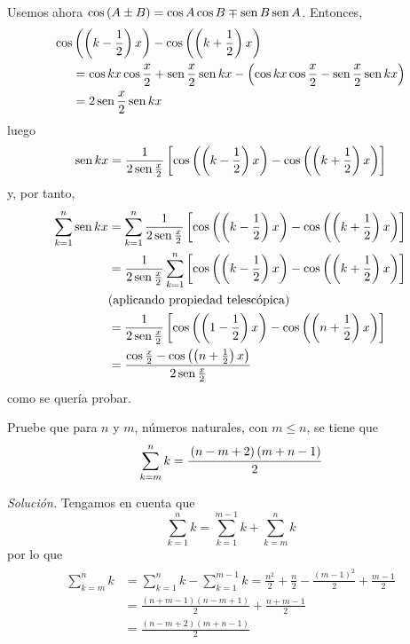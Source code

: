 \begin{parrafonumerado}[label=\alph*)]
\item Usemos ahora $\cos \left( A\pm B\right) =\cos A\cos B\mp \operatorname{sen} B\operatorname{sen} A$. Entonces,
\begin{align*}
\cos &\left( \left( k-\frac{1}{2}\right) x\right) -\cos \left( \left( k+\frac{1}{2}\right) x\right)\\
&=\cos kx\cos \frac{x}{2}+\operatorname{sen} \frac{x}{2}\operatorname{sen}
kx-\left( \cos kx\cos \frac{x}{2}-\operatorname{sen} \frac{x}{2}\operatorname{sen} kx\right)\\
&=2\operatorname{sen} \frac{x}{2}\operatorname{sen} kx
\end{align*}
luego
\[
\sen kx=\frac{1}{2\sen\frac{x}{2}}\left[ \cos \left( \left( k-\frac{1%
  }{2}\right) x\right) -\cos \left( \left( k+\frac{1}{2}\right) x\right) %
\right]
\]
y, por tanto,
\begin{gather*}
\begin{aligned}
  \sum\limits_{k=1}^{n}\sen kx&=\sum\limits_{k=1}^{n}\frac{1}{2\sen\frac{x}{2}}\left[ \cos \left( \left( k-\frac{1}{2}\right) x\right) -\cos \left(
  \left( k+\frac{1}{2}\right) x\right) \right]\\
  &=\frac{1}{2\sen\frac{x}{2}}\sum\limits_{k=1}^{n}\left[ \cos \left( \left(
    k-\frac{1}{2}\right) x\right) -\cos \left( \left( k+\frac{1}{2}\right)
  x\right) \right]\\
  &\text{(aplicando propiedad telescópica)}\\
  &=\frac{1}{2\sen\frac{x}{2}}\left[ \cos \left( \left( 1-\frac{1}{2}\right)
  x\right) -\cos \left( \left( n+\frac{1}{2}\right) x\right) \right] \\
  &=\frac{\cos \frac{x}{2} -\cos \left( \left( n+\frac{1}{2}%
  \right) x\right) }{2\sen \frac{x}{2}}
\end{aligned}
\end{gather*}
como se quería probar.
\end{parrafonumerado}

\begin{ejemplo}
Pruebe que para $n$ y $m$, números naturales, con $m\leq n$, se tiene que
\[
\sum_{k=m}^{n}k=\cfrac{\left( n-m+2\right) \left( m+n-1\right) }{2}
\]
\end{ejemplo}

\emph{Solución.} Tengamos en cuenta que
\[
\sum_{k=1}^n k=\sum_{k=1}^{m-1} k+ \sum_{k=m}^n k
\]
por lo que
\begin{gather*}
\begin{aligned}
\sum_{k=m}^{n}k&=\sum_{k=1}^{n}k-\sum_{k=1}^{m-1}k
=\frac{n^{2}}{2}+\frac{n}{2}-\frac{\left( m-1\right) ^{2}}{2}+\frac{m-1}{2}\\
&=\frac{\left( n+m-1\right)\left( n-m+1\right) }{2}+\frac{n+m-1}{2}\\
&=\frac{\left( n-m+2\right) \left( m+n-1\right) }{2}
\end{aligned}
\end{gather*}

